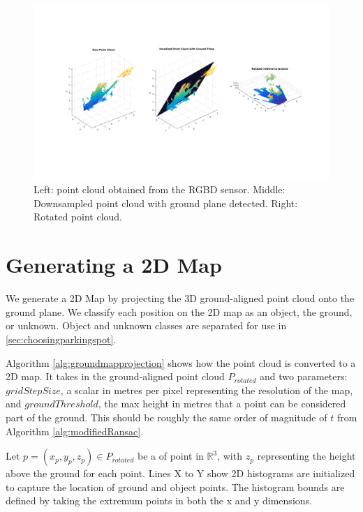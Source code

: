 \begin{figure}
\centering
\includegraphics[width=6in]{figures/pointclouds.png}
\caption{Left: point cloud obtained from the RGBD sensor. Middle:
Downsampled point cloud with ground plane detected. Right: Rotated point cloud.}
\label{fig:pointclouds}
\end{figure}

\section{Generating a 2D Map}
\label{sec:2dmap}
We generate a 2D Map by projecting the 3D ground-aligned point cloud onto the
ground plane.
We classify each position on the 2D map as an object, the ground, or unknown.
Object and unknown classes are separated for use in
\autoref{sec:choosingparkingspot}.

Algorithm \autoref{alg:groundmapprojection} shows how the point cloud is
converted to a 2D map. It takes in the ground-aligned point cloud $P_{rotated}$
and two parameters: $gridStepSize$, a scalar in metres per pixel representing
the resolution of the map, and $groundThreshold$, the max height in metres that
a point can be considered part of the ground. This should be roughly the same
order of magnitude of $t$ from Algorithm \ref{alg:modifiedRansac}.

Let $p = (x_p, y_p, z_p) \in P_{rotated}$ be a of point in $\mathbb{R}^3$, with
$z_p$ representing the height above the ground for each point. Lines X to Y show
2D histograms are initialized to capture the location of ground and object
points. The histogram bounds are defined by taking the extremum points in both
the x and y dimensions.




